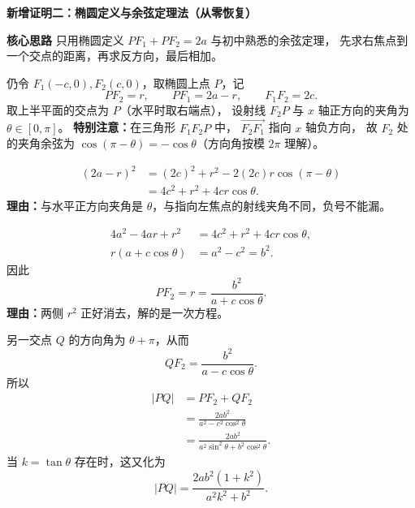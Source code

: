 \begin{proofbox}
    \textbf{\textcolor{CProof}{新增证明二：椭圆定义与余弦定理法（从零恢复）}}

    \textbf{\textcolor{CProof}{核心思路}}
    只用椭圆定义 $PF_1+PF_2=2a$ 与初中熟悉的余弦定理，
    先求右焦点到一个交点的距离，再求反方向，最后相加。

    仍令 $F_1(-c,0),F_2(c,0)$，取椭圆上点 $P$，记
    \[
        PF_2=r,\qquad PF_1=2a-r,\qquad F_1F_2=2c.
    \]
    取上半平面的交点为 $P$（水平时取右端点），
    设射线 $F_2P$ 与 $x$ 轴正方向的夹角为 $\theta\in[0,\pi]$。
    \textbf{特别注意：}在三角形 $F_1F_2P$ 中，
    $\overrightarrow{F_2F_1}$ 指向 $x$ 轴负方向，
    故 $F_2$ 处的夹角余弦为 $\cos(\pi-\theta)=-\cos\theta$（方向角按模 $2\pi$ 理解）。

    \begin{description}[style=nextline,leftmargin=2.8em,labelsep=0.5em,itemsep=0.55em]
        \item[\textbf{第一步（在焦点三角形中用余弦定理）：}]
              \[
                  \begin{aligned}
                  (2a-r)^2
                  &=(2c)^2+r^2-2(2c)r\cos(\pi-\theta)\\
                  &=4c^2+r^2+4cr\cos\theta.
                  \end{aligned}
              \]
              \textbf{理由：}与水平正方向夹角是 $\theta$，与指向左焦点的射线夹角不同，负号不能漏。

        \item[\textbf{第二步（消掉平方，求单段焦半径）：}]
              \[
                  \begin{aligned}
                  4a^2-4ar+r^2&=4c^2+r^2+4cr\cos\theta,\\
                  r(a+c\cos\theta)&=a^2-c^2=b^2.
                  \end{aligned}
              \]
              因此
              \[
                  \boxed{PF_2=r=\frac{b^2}{a+c\cos\theta}}.
              \]
              \textbf{理由：}两侧 $r^2$ 正好消去，解的是一次方程。

        \item[\textbf{第三步（对向点换角、两段相加）：}]
              另一交点 $Q$ 的方向角为 $\theta+\pi$，从而
              \[
                  QF_2=\frac{b^2}{a-c\cos\theta}.
              \]
              所以
              \[
                  \begin{aligned}
                  |PQ|&=PF_2+QF_2\\
                      &=\frac{2ab^2}{a^2-c^2\cos^2\theta}\\
                      &=\frac{2ab^2}{a^2\sin^2\theta+b^2\cos^2\theta}.
                  \end{aligned}
              \]
              当 $k=\tan\theta$ 存在时，这又化为
              \[
                  \boxed{|PQ|=\frac{2ab^2(1+k^2)}{a^2k^2+b^2}}.
              \]
    \end{description}


\end{proofbox}
